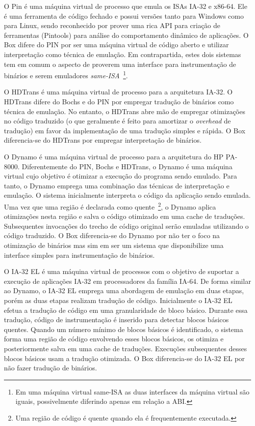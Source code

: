 \documentclass[11pt,twoside]{article}
\begin{document}
O Pin \cite{Luk2005} é uma máquina virtual de processo que emula os ISAs IA-32 e 
x86-64. Ele é uma ferramenta de código fechado e possui versões tanto para Windows 
como para Linux, sendo reconhecido por prover uma rica API para criação de 
ferramentas (Pintools) para análise do comportamento dinâmico de aplicações. O Box 
difere do PIN por ser uma máquina virtual de código aberto e utilizar interpretação 
como técnica de emulação. Em contrapartida, estes dois sistemas tem em comum o 
aspecto de proverem uma interface para instrumentação de binários e serem emuladores 
\emph{same-ISA}~\footnote{Em uma máquina virtual same-ISA as duas interfaces da 
máquina virtual são iguais, possivelmente diferindo apenas em relação a ABI.}.

O HDTrans \cite{Sridhar2006} é uma máquina virtual de processo para a arquitetura 
IA-32. O HDTrans difere do Bochs e do PIN por empregar tradução de binários como 
técnica de emulação. No entanto, o HDTrans abre mão de empregar otimizações no 
código traduzido (o que geralmente é feito para amortizar o \textit{overhead} de tradução) 
em favor da implementação de uma tradução simples e rápida. O Box diferencia-se do 
HDTrans por empregar interpretação de binários.

O Dynamo \cite{Bala2000} é uma máquina virtual de processo para a arquitetura do 
HP PA-8000. Diferentemente do PIN, Bochs e HDTrans, o Dynamo é uma máquina virtual 
cujo objetivo é otimizar a execução do programa sendo emulado. Para tanto, o Dynamo 
emprega uma combinação das técnicas de interpretação e emulação. O sistema 
inicialmente interpreta o código da aplicação sendo emulada. Uma vez que uma região 
é declarada como quente~\footnote{Uma região de código é quente quando ela é 
frequentemente executada.}, o Dynamo aplica otimizações nesta região e salva o 
código otimizado em uma cache de traduções. Subsequentes invocações do trecho de 
código original serão emuladas utilizando o código traduzido. O Box diferencia-se 
do Dynamo por não ter o foco na otimização de binários mas sim em ser um sistema 
que disponibilize uma interface simples para instrumentação de binários.

O IA-32 EL \cite{Baraz2003} é uma máquina virtual de processos com o objetivo de 
suportar a execução de aplicações IA-32 em processadores da família IA-64. De forma 
similar ao Dynamo, o IA-32 EL emprega uma abordagem de emulação em duas etapas, 
porém as duas etapas realizam tradução de código. Inicialmente o IA-32 EL efetua a 
tradução de código em uma granularidade de bloco básico. Durante essa tradução, 
código de instrumentação é inserido para detectar blocos básicos quentes. Quando um 
número mínimo de blocos básicos é identificado, o sistema forma uma região de código 
envolvendo esses blocos básicos, os otimiza e posteriormente salva em uma cache de 
traduções. Execuções subsequentes desses blocos básicos usam a tradução otimizada. 
O Box diferencia-se do IA-32 EL por não fazer tradução de binários.
\end{document}
